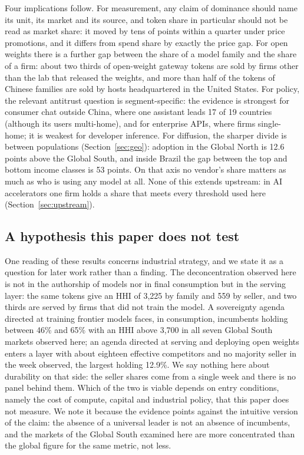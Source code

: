 \documentclass[11pt]{article}
\begin{document}
Four implications follow. For measurement, any claim of dominance should name its unit, its market and its source, and token share in particular should not be read as market share: it moved by tens of points within a quarter under price promotions, and it differs from spend share by exactly the price gap. For open weights there is a further gap between the share of a model family and the share of a firm: about two thirds of open-weight gateway tokens are sold by firms other than the lab that released the weights, and more than half of the tokens of Chinese families are sold by hosts headquartered in the United States. For policy, the relevant antitrust question is segment-specific: the evidence is strongest for consumer chat outside China, where one assistant leads 17 of 19 countries (although its users multi-home), and for enterprise APIs, where firms single-home; it is weakest for developer inference. For diffusion, the sharper divide is between populations (Section~\ref{sec:geo}): adoption in the Global North is 12.6 points above the Global South, and inside Brazil the gap between the top and bottom income classes is 53 points. On that axis no vendor's share matters as much as who is using any model at all. None of this extends upstream: in AI accelerators one firm holds a share that meets every threshold used here (Section~\ref{sec:upstream}).

\subsection{A hypothesis this paper does not test} One reading of these results concerns industrial strategy, and we state it as a question for later work rather than a finding. The deconcentration observed here is not in the authorship of models nor in final consumption but in the serving layer: the same tokens give an HHI of 3{,}225 by family and 559 by seller, and two thirds are served by firms that did not train the model. A sovereignty agenda directed at training frontier models faces, in consumption, incumbents holding between 46\% and 65\% with an HHI above 3{,}700 in all seven Global South markets observed here; an agenda directed at serving and deploying open weights enters a layer with about eighteen effective competitors and no majority seller in the week observed, the largest holding 12.9\%. We say nothing here about durability on that side: the seller shares come from a single week and there is no panel behind them. Which of the two is viable depends on entry conditions, namely the cost of compute, capital and industrial policy, that this paper does not measure. We note it because the evidence points against the intuitive version of the claim: the absence of a universal leader is not an absence of incumbents, and the markets of the Global South examined here are more concentrated than the global figure for the same metric, not less.
\end{document}
